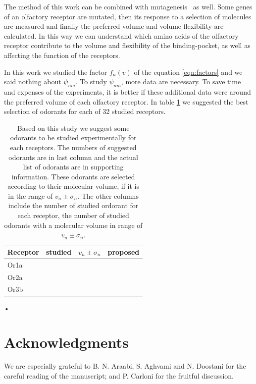 \documentclass[11pt]{paper} %
\newcommand{\numberofreceptors}{32 }
\begin{document}
The method of this work can be combined with mutagenesis~\cite{} as well. 
Some genes of an olfactory receptor are mutated, 
then its response to a selection of molecules are measured and finally the preferred volume and volume flexibility are calculated.
In this way we can understand which amino acids of the olfactory receptor contribute to the volume and flexibility of the binding-pocket, 
as well as affecting the function of the receptors.

In this work we studied the factor $f_n(v)$ of the equation \ref{eqn:factors} and we said nothing about $\psi_{nm}$. 
To study $\psi_{nm}$, more data are necessary. 
To save time and expenses of the experiments, 
it is better if these additional data were around the preferred volume of each olfactory receptor.
In table \ref{tab:receptor-odorant} we suggested the best selection of odorants for each of \numberofreceptors studied receptors.

\begin{table}
\centering
	\begin{tabular}{|l|r|r|r|}
		\hline 
		Receptor & studied & $v_n \pm \sigma_n$ & proposed\\ \hline 
		Or1a & & & \\
		Or2a & & & \\
		Or3b & & & \\	\hline
	\end{tabular}
	\caption{Based on this study we suggest some odorants to be studied experimentally for each receptors. 		
		The numbers of suggested odorants are in last column and the actual list of odorants are in supporting information.
		These odorants are selected according to their molecular volume, if it is in the range of $v_n \pm \sigma_n$.
		The other columns include the number of studied ordorant for each receptor, 
		the number of studied odorants with a molecular volume in range of $v_n \pm \sigma_n$.}
	\label{tab:receptor-odorant}
\end{table}•

\section{Acknowledgments}
We are especially grateful to B. N. Araabi, S. Aghvami and N. Doostani for the careful reading of the manuscript; and P. Carloni for the fruitful discussion.

\printbibliography
\end{document}
